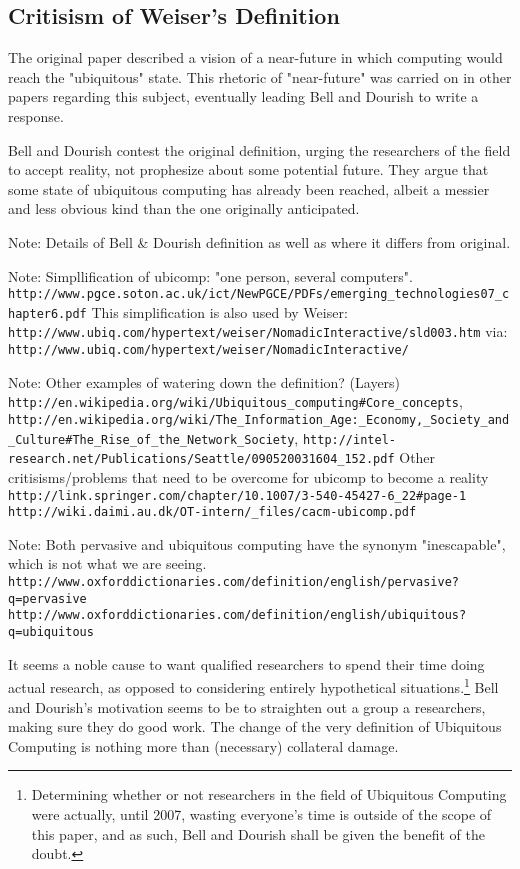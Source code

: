\subsection*{Critisism of Weiser's Definition}

The original paper described a vision of a near-future in which computing would reach the "ubiquitous" state.
This rhetoric of "near-future" was carried on in other papers regarding this subject, eventually leading Bell
and Dourish to write a response.

Bell and Dourish contest the original definition, urging the researchers of the field to accept reality, not
prophesize about some potential future. They argue that some state of ubiquitous computing has already been
reached, albeit a messier and less obvious kind than the one originally anticipated.

Note: Details of Bell \& Dourish definition as well as where it differs from original.\cite{bell07}

Note: Simpllification of ubicomp: "one person, several computers".
\verb+http://www.pgce.soton.ac.uk/ict/NewPGCE/PDFs/emerging_technologies07_chapter6.pdf+
This simplification is also used by Weiser: \verb+http://www.ubiq.com/hypertext/weiser/NomadicInteractive/sld003.htm+
via: \verb+http://www.ubiq.com/hypertext/weiser/NomadicInteractive/+

Note:
Other examples of watering down the definition? (Layers)
\verb+http://en.wikipedia.org/wiki/Ubiquitous_computing#Core_concepts+,
\verb+http://en.wikipedia.org/wiki/The_Information_Age:_Economy,_Society_and_Culture#The_Rise_of_the_Network_Society+,
\verb+http://intel-research.net/Publications/Seattle/090520031604_152.pdf+
Other critisisms/problems that need to be overcome for ubicomp to become a reality
\verb+http://link.springer.com/chapter/10.1007/3-540-45427-6_22#page-1+
\verb+http://wiki.daimi.au.dk/OT-intern/_files/cacm-ubicomp.pdf+

Note: Both pervasive and ubiquitous computing have the synonym "inescapable", which is not what we are seeing.
\verb+http://www.oxforddictionaries.com/definition/english/pervasive?q=pervasive+
\verb+http://www.oxforddictionaries.com/definition/english/ubiquitous?q=ubiquitous+

It seems a noble cause to want qualified researchers to spend their time doing actual research, as opposed to
considering entirely hypothetical situations.\footnote{Determining whether or not researchers in the field of
Ubiquitous Computing were actually, until 2007, wasting everyone's time is outside of the scope of this paper,
and as such, Bell and Dourish shall be given the benefit of the doubt.} Bell and Dourish's motivation seems to
be to straighten out a group a researchers, making sure they do good work. The change of the very definition of
Ubiquitous Computing is nothing more than (necessary) collateral damage.

